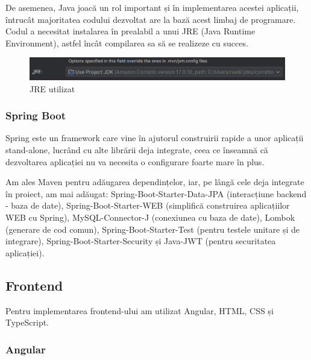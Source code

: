 De asemenea, Java joacă un rol important și în implementarea acestei aplicații, întrucât majoritatea codului dezvoltat are la bază acest limbaj de programare. Codul a necesitat instalarea în prealabil a unui JRE (Java Runtime Environment), astfel încât compilarea sa să se realizeze cu succes.

\begin{figure}[!htb]
    \centering
    \includegraphics[width=0.9\linewidth]{images/JRE.png}
    \caption{JRE utilizat}
    \label{fig:JRE}
\end{figure}

\vspace{0.5em}
    
\begin{minipage}{\textwidth}
\hfill
\begin{minipage}{0.9\textwidth}
\subsubsection{Spring Boot}
\end{minipage}
\end{minipage}

\hspace{0cm}Spring este un framework care vine în ajutorul construirii rapide a unor aplicații stand-alone, lucrând cu alte librării deja integrate, ceea ce înseamnă că dezvoltarea aplicației nu va necesita o  configurare foarte mare în plus.\cite{citation4}

Am ales Maven pentru adăugarea dependințelor, iar, pe lângă cele deja integrate în proiect, am mai adăugat: Spring-Boot-Starter-Data-JPA (interacțiune backend - baza de date), Spring-Boot-Starter-WEB (simplifică construirea aplicațiilor WEB cu Spring), MySQL-Connector-J (conexiunea cu baza de date), Lombok (generare de cod comun), Spring-Boot-Starter-Test (pentru testele unitare și de integrare), Spring-Boot-Starter-Security și Java-JWT (pentru securitatea aplicației).

\vspace{1.5em}
\subsection{Frontend}
Pentru implementarea frontend-ului am utilizat Angular, HTML, CSS și TypeScript.

\begin{minipage}{\textwidth}
\hfill
\begin{minipage}{0.9\textwidth}
\subsubsection{Angular}
\end{minipage}
\end{minipage}

